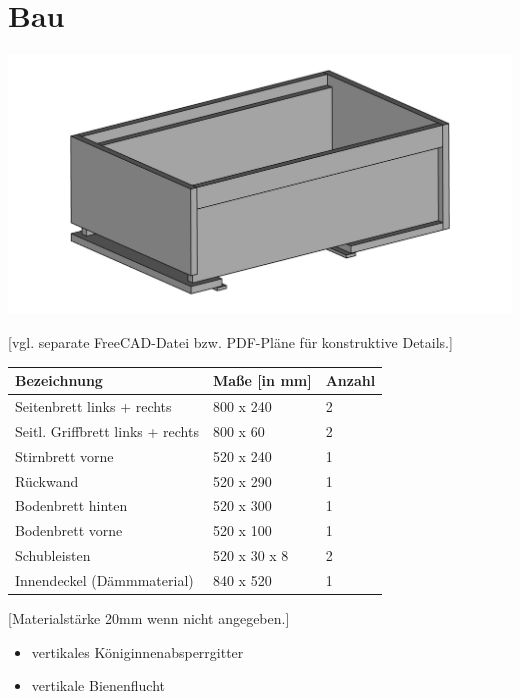 \documentclass[12pt,a4paper,ngerman]{scrartcl}
\begin{document}
\section{Bau}

\includegraphics[width=\textwidth]{ansicht1}

[vgl. separate FreeCAD-Datei bzw. PDF-Pläne für konstruktive Details.]


\begin{center}
\begin{tabular}{lll}
  Bezeichnung &                       Maße [in mm] &          Anzahl \\
  \hline
  Seitenbrett links + rechts &        800 x 240 &             2 \\
  Seitl. Griffbrett links + rechts &  800 x 60 &              2 \\
  Stirnbrett vorne &                  520 x 240 &             1 \\
  Rückwand &                          520 x 290 &             1 \\
  Bodenbrett hinten &                 520 x 300 &             1 \\
  Bodenbrett vorne &                  520 x 100 &             1 \\
  Schubleisten &                      520 x 30 x 8 &          2 \\
  \hline
  Innendeckel (Dämmmaterial) &        840 x 520 &             1 \\
  \hline
\end{tabular}

[Materialstärke 20mm wenn nicht angegeben.]
\end{center}



\begin{itemize}
\item vertikales Königinnenabsperrgitter
\item vertikale Bienenflucht
\end{itemize}
\end{document}
